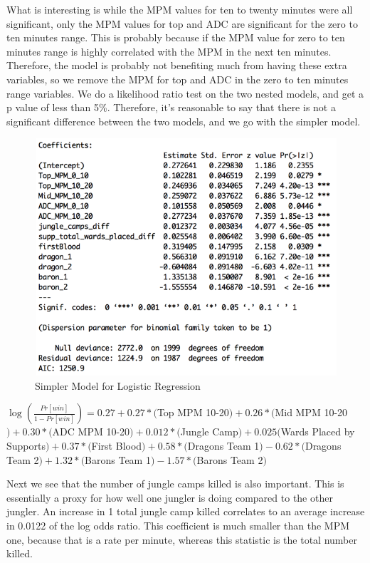 \documentclass[runningheads]{llncs}
\begin{document}
	What is interesting is while the MPM values for ten to twenty minutes were all significant, only the MPM values for top and ADC are significant for the zero to ten minutes range. This is probably because if the MPM value for zero to ten minutes range is highly correlated with the MPM in the next ten minutes. Therefore, the model is probably not benefiting much from having these extra variables, so we remove the MPM for top and ADC in the zero to ten minutes range variables. We do a likelihood ratio test on the two nested models, and get a p value of less than 5\%. Therefore, it’s reasonable to say that there is not a significant difference between the two models, and we go with the simpler model.
	
	\begin{figure}[!htb]
		\centering
		\includegraphics[width=\textwidth]{images/lr_simple.png}
		\caption{Simpler Model for Logistic Regression}
	\end{figure}
	
	$\log(\frac{Pr[win]}{1 - Pr[win]}) = 0.27 + 0.27 * ($Top MPM 10-20$) + 0.26 * ($Mid MPM 10-20$) + 0.30 * ($ADC MPM 10-20$) + 0.012 * ($Jungle Camp$) + 0.025 ($Wards Placed by Supports$) + 0.37 * ($First Blood$) + 0.58 * ($Dragons Team 1$) - 0.62 * ($Dragons Team 2$) + 1.32 * ($Barons Team 1$) - 1.57 * ($Barons Team 2$)$
	
	
	Next we see that the number of jungle camps killed is also important. This is essentially a proxy for how well one jungler is doing compared to the other jungler. An increase in 1 total jungle camp killed correlates to an average increase in 0.0122 of the log odds ratio. This coefficient is much smaller than the MPM one, because that is a rate per minute, whereas this statistic is the total number killed.
\end{document}
